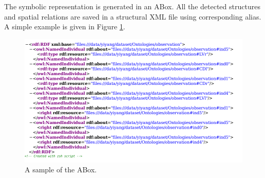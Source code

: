 \documentclass{article}
\begin{document}
The symbolic representation is generated in an ABox. All the detected structures and spatial relations are saved in a structural XML file using corresponding alias.
A simple example is given in Figure \ref{fig:owlfile}.
\begin{figure}[h]
 \centering
 \includegraphics[width=.5\textwidth]{./figures/xml_screenshot.png}
 \caption{\label{fig:owlfile}A sample of the ABox.}
\end{figure}


 

\end{document}
